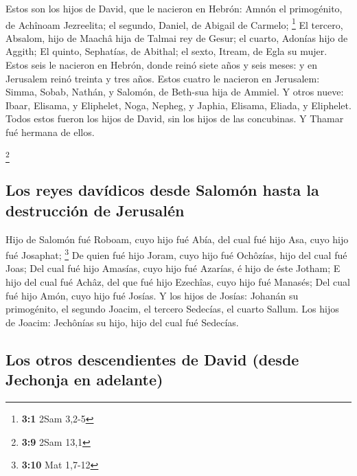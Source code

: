  Estos son los hijos de David, que le nacieron en Hebrón:
Amnón el primogénito, de Achînoam Jezreelita; el segundo, Daniel, de
Abigail de Carmelo; \footnote{\textbf{3:1} 2Sam 3,2-5}  El
tercero, Absalom, hijo de Maachâ hija de Talmai rey de Gesur; el cuarto,
Adonías hijo de Aggith;  El quinto, Sephatías, de Abithal;
el sexto, Itream, de Egla su mujer.  Estos seis le
nacieron en Hebrón, donde reinó siete años y seis meses: y en Jerusalem
reinó treinta y tres años.  Estos cuatro le nacieron en
Jerusalem: Simma, Sobab, Nathán, y Salomón, de Beth-sua hija de Ammiel.
 Y otros nueve: Ibaar, Elisama, y Eliphelet,
 Noga, Nepheg, y Japhia,  Elisama, Eliada, y
Eliphelet.  Todos estos fueron los hijos de David, sin los
hijos de las concubinas. Y Thamar fué hermana de ellos.

\footnote{\textbf{3:9} 2Sam 13,1}

\hypertarget{los-reyes-davuxeddicos-desde-salomuxf3n-hasta-la-destrucciuxf3n-de-jerusaluxe9n}{%
\subsection{Los reyes davídicos desde Salomón hasta la destrucción de
Jerusalén}\label{los-reyes-davuxeddicos-desde-salomuxf3n-hasta-la-destrucciuxf3n-de-jerusaluxe9n}}

 Hijo de Salomón fué Roboam, cuyo hijo fué Abía, del cual
fué hijo Asa, cuyo hijo fué Josaphat; \footnote{\textbf{3:10} Mat 1,7-12}
 De quien fué hijo Joram, cuyo hijo fué Ochôzías, hijo
del cual fué Joas;  Del cual fué hijo Amasías, cuyo hijo
fué Azarías, é hijo de éste Jotham;  E hijo del cual fué
Achâz, del que fué hijo Ezechîas, cuyo hijo fué Manasés; 
Del cual fué hijo Amón, cuyo hijo fué Josías.  Y los
hijos de Josías: Johanán su primogénito, el segundo Joacim, el tercero
Sedecías, el cuarto Sallum.  Los hijos de Joacim:
Jechônías su hijo, hijo del cual fué Sedecías.

\hypertarget{los-otros-descendientes-de-david-desde-jechonja-en-adelante}{%
\subsection{Los otros descendientes de David (desde Jechonja en
adelante)}\label{los-otros-descendientes-de-david-desde-jechonja-en-adelante}}

